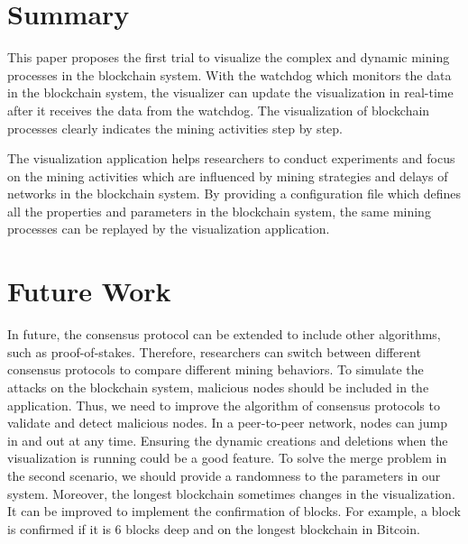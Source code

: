 \section{Summary}

This paper proposes the first trial to visualize the complex and dynamic mining processes in the blockchain system. With the watchdog which monitors the data in the blockchain system, the visualizer can update the visualization in real-time after it receives the data from the watchdog. The visualization of blockchain processes clearly indicates the mining activities step by step. 

The visualization application helps researchers to conduct experiments and focus on the mining activities which are influenced by mining strategies and delays of networks in the blockchain system. By providing a configuration file which defines all the properties and parameters in the blockchain system, the same mining processes can be replayed by the visualization application.

\section{Future Work}

In future, the consensus protocol can be extended to include other algorithms, such as proof-of-stakes. Therefore, researchers can switch between different consensus protocols to compare different mining behaviors. To simulate the attacks on the blockchain system, malicious nodes should be included in the application. Thus, we need to improve the algorithm of consensus protocols to validate and detect malicious nodes. In a peer-to-peer network, nodes can jump in and out at any time. Ensuring the dynamic creations and deletions when the visualization is running could be a good feature. To solve the merge problem in the second scenario, we should provide a randomness to the parameters in our system. Moreover, the longest blockchain sometimes changes in the visualization. It can be improved to implement the confirmation of blocks. For example, a block is confirmed if it is 6 blocks deep and on the longest blockchain in Bitcoin.
